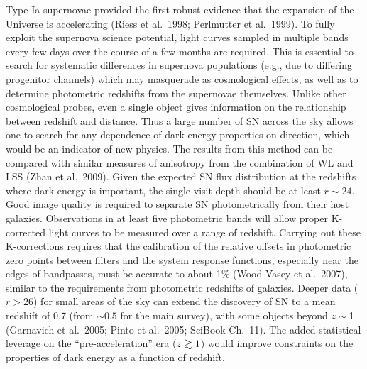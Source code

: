 Type Ia supernovae provided the first robust evidence that the expansion of the
Universe is accelerating (Riess et al.~1998; Perlmutter et al.~1999). To fully
exploit the supernova science potential, light curves sampled in multiple
bands every few days over the course of a few months are required. This is
essential to search for systematic differences in supernova populations
(e.g., due to differing progenitor channels) which
may masquerade as cosmological effects, as well as to determine photometric
redshifts from the supernovae themselves. Unlike other cosmological probes,
even a single object gives information on the relationship between
redshift and distance.  Thus a large
number of SN across the sky allows one to search for any dependence
of dark energy properties on direction, which
would be an indicator of new physics. The results from this method can be compared
with similar measures of anisotropy from the combination of WL and LSS
(Zhan et al.~2009).
Given the expected SN flux distribution
at the redshifts where dark energy is important, the
single visit depth should be at least $r\sim24$. Good image quality is
required to separate SN photometrically from
their host galaxies. Observations in at least five photometric bands will allow
proper K-corrected light curves to be measured over a range of
redshift.  Carrying out these K-corrections requires that the
calibration of the relative offsets in photometric zero points between filters and
the system response functions, especially near the edges of
bandpasses, must be accurate to about 1\% (Wood-Vasey et al.~2007),
similar to the requirements from photometric redshifts of galaxies. Deeper data
($r>26$) for small areas of the sky can extend the discovery of SN to a mean
redshift of 0.7 (from $\sim0.5$ for the main survey), with some objects beyond $z\sim$1
(Garnavich et al.~2005; Pinto et al.~2005; SciBook Ch.~11). The added statistical leverage
on the ``pre-acceleration'' era ($z\gtrsim1$) would improve constraints on the properties of
dark energy as a function of redshift.

